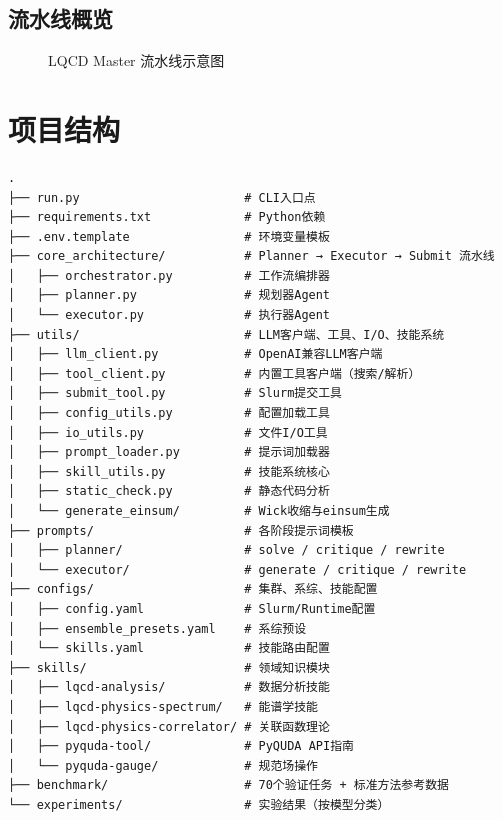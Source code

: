 \documentclass[12pt,a4paper]{ctexart}
\begin{document}
\subsection{流水线概览}
\begin{figure}[H]
\centering
{}
\caption{LQCD Master 流水线示意图}
\label{fig:pipeline}
\end{figure}

\section{项目结构}

\begin{lstlisting}[caption={LQCD Master 项目目录结构}, label={lst:structure}]
.
├── run.py                       # CLI入口点
├── requirements.txt             # Python依赖
├── .env.template                # 环境变量模板
├── core_architecture/           # Planner → Executor → Submit 流水线
│   ├── orchestrator.py          # 工作流编排器
│   ├── planner.py               # 规划器Agent
│   └── executor.py              # 执行器Agent
├── utils/                       # LLM客户端、工具、I/O、技能系统
│   ├── llm_client.py            # OpenAI兼容LLM客户端
│   ├── tool_client.py           # 内置工具客户端（搜索/解析）
│   ├── submit_tool.py           # Slurm提交工具
│   ├── config_utils.py          # 配置加载工具
│   ├── io_utils.py              # 文件I/O工具
│   ├── prompt_loader.py         # 提示词加载器
│   ├── skill_utils.py           # 技能系统核心
│   ├── static_check.py          # 静态代码分析
│   └── generate_einsum/         # Wick收缩与einsum生成
├── prompts/                     # 各阶段提示词模板
│   ├── planner/                 # solve / critique / rewrite
│   └── executor/                # generate / critique / rewrite
├── configs/                     # 集群、系综、技能配置
│   ├── config.yaml              # Slurm/Runtime配置
│   ├── ensemble_presets.yaml    # 系综预设
│   └── skills.yaml              # 技能路由配置
├── skills/                      # 领域知识模块
│   ├── lqcd-analysis/           # 数据分析技能
│   ├── lqcd-physics-spectrum/   # 能谱学技能
│   ├── lqcd-physics-correlator/ # 关联函数理论
│   ├── pyquda-tool/             # PyQUDA API指南
│   └── pyquda-gauge/            # 规范场操作
├── benchmark/                   # 70个验证任务 + 标准方法参考数据
└── experiments/                 # 实验结果（按模型分类）
\end{lstlisting}
\end{document}
